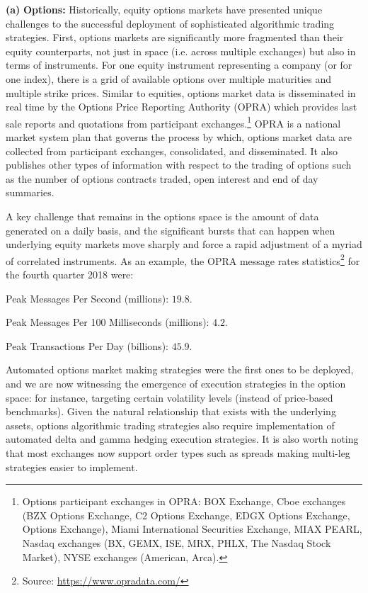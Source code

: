 \noindent\textbf{(a)} \textbf{Options:} Historically, equity options markets have presented unique challenges to the successful deployment of sophisticated algorithmic trading strategies. First, options markets are significantly more fragmented than their equity counterparts, not just in space (i.e. across multiple exchanges) but also in terms of instruments. For one equity instrument representing a company (or for one index), there is a grid of available options over multiple maturities and multiple strike prices. Similar to equities, options market data is disseminated in real time by the Options Price Reporting Authority (OPRA) which provides last sale reports and quotations from participant exchanges.\footnote{Options participant exchanges in OPRA: BOX Exchange, Cboe exchanges (BZX Options Exchange, C2 Options Exchange, EDGX Options Exchange, Options Exchange), Miami International Securities Exchange, MIAX PEARL, Nasdaq exchanges (BX, GEMX, ISE, MRX, PHLX, The Nasdaq Stock Market), NYSE exchanges (American, Arca).} OPRA is a national market system plan that governs the process by which, options market data are collected from participant exchanges, consolidated, and disseminated. It also publishes other types of information with respect to the trading of options such as the number of options contracts traded, open interest and end of day summaries. 


A key challenge that remains in the options space is the amount of data generated on a daily basis, and the significant bursts that can happen when underlying equity markets move sharply and force a rapid adjustment of a myriad of correlated instruments. As an example, the OPRA message rates statistics\footnote{Source: \url{https://www.opradata.com/}} for the fourth quarter 2018 were: \twomedskip

\noindent Peak Messages Per Second (millions): $19.8$.

\noindent Peak Messages Per 100 Milliseconds (millions): $4.2$.

\noindent Peak Transactions Per Day (billions): $45.9$. \twomedskip


Automated options market making strategies were the first ones to be deployed, and we are now witnessing the emergence of execution strategies in the option space: for instance, targeting certain volatility levels (instead of price-based benchmarks). Given the natural relationship that exists with the underlying assets, options algorithmic trading strategies also require implementation of automated delta and gamma hedging execution strategies. It is also worth noting that most exchanges now support order types such as spreads making multi-leg strategies easier to implement. \twomedskip


